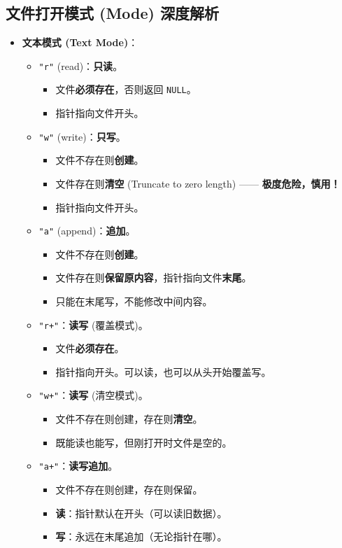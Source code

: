 \documentclass[a4paper,12pt]{article}
\begin{document}
\subsection{文件打开模式 (Mode) 深度解析}
\begin{itemize}
    \item \textbf{文本模式 (Text Mode)}：
    \begin{itemize}
        \item \texttt{"r"} (read)：\textbf{只读}。
        \begin{itemize}
            \item 文件\textbf{必须存在}，否则返回 \texttt{NULL}。
            \item 指针指向文件开头。
        \end{itemize}
        \item \texttt{"w"} (write)：\textbf{只写}。
        \begin{itemize}
            \item 文件不存在则\textbf{创建}。
            \item 文件存在则\textbf{清空} (Truncate to zero length) —— \textbf{极度危险，慎用！}
            \item 指针指向文件开头。
        \end{itemize}
        \item \texttt{"a"} (append)：\textbf{追加}。
        \begin{itemize}
            \item 文件不存在则\textbf{创建}。
            \item 文件存在则\textbf{保留原内容}，指针指向文件\textbf{末尾}。
            \item 只能在末尾写，不能修改中间内容。
        \end{itemize}
        \item \texttt{"r+"}：\textbf{读写} (覆盖模式)。
        \begin{itemize}
            \item 文件\textbf{必须存在}。
            \item 指针指向开头。可以读，也可以从头开始覆盖写。
        \end{itemize}
        \item \texttt{"w+"}：\textbf{读写} (清空模式)。
        \begin{itemize}
            \item 文件不存在则创建，存在则\textbf{清空}。
            \item 既能读也能写，但刚打开时文件是空的。
        \end{itemize}
        \item \texttt{"a+"}：\textbf{读写追加}。
        \begin{itemize}
            \item 文件不存在则创建，存在则保留。
            \item \textbf{读}：指针默认在开头（可以读旧数据）。
            \item \textbf{写}：永远在末尾追加（无论指针在哪）。
        \end{itemize}
    \end{itemize}


\end{itemize}
\end{document}
